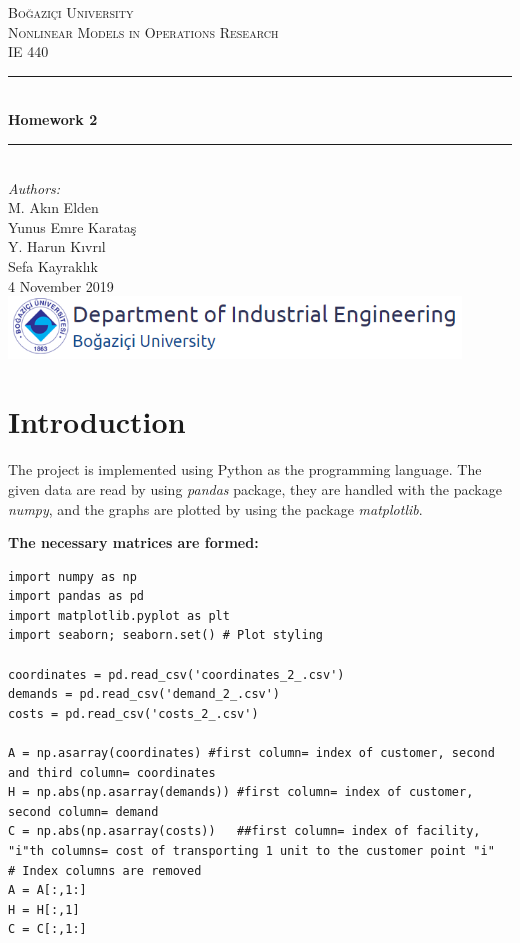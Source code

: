 \documentclass[12pt]{article}
\begin{document}
\begin{titlepage}

\newcommand{\HRule}{\rule{\linewidth}{0.5mm}} 							%
\center 
 
\textsc{\LARGE Boğaziçi University}\\[1cm]

\textsc{\Large Nonlinear Models in Operations Research}\\[0.2cm]
\textsc{\large IE 440}\\[1cm] 						%
\HRule \\[0.8cm]
{ \huge \bfseries Homework 2}\\[0.7cm]				%
\HRule \\[2cm]
\large
\emph{Authors:}\\
 M. Akın Elden\\Yunus Emre Karataş\\Y. Harun Kıvrıl\\Sefa Kayraklık \\[1.5cm]										%
{\large 4 November 2019}\\[5cm]
\includegraphics[width=0.9\textwidth]{Boun_logo.png}\\[1cm] 	%
\vfill 
\end{titlepage}


\onehalfspacing
\section{Introduction}

The project is implemented using Python as the programming language. The given data are read by using \textit{pandas} package, they are handled with the package \textit{numpy}, and the graphs are plotted by using the package \textit{matplotlib}.

\textbf{The necessary matrices are formed:}
\begin{lstlisting}[style=pythonstyle]
import numpy as np
import pandas as pd
import matplotlib.pyplot as plt
import seaborn; seaborn.set() # Plot styling

coordinates = pd.read_csv('coordinates_2_.csv')
demands = pd.read_csv('demand_2_.csv')
costs = pd.read_csv('costs_2_.csv')

A = np.asarray(coordinates) #first column= index of customer, second and third column= coordinates
H = np.abs(np.asarray(demands)) #first column= index of customer, second column= demand
C = np.abs(np.asarray(costs))   ##first column= index of facility, "i"th columns= cost of transporting 1 unit to the customer point "i"
# Index columns are removed
A = A[:,1:]
H = H[:,1]
C = C[:,1:]  
\end{lstlisting}
\end{document}
